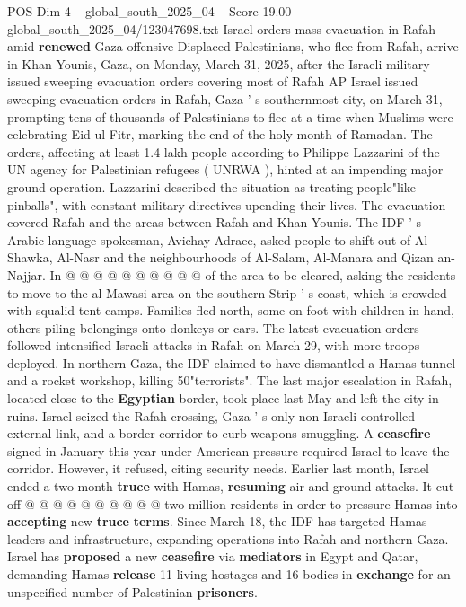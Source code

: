 \begin{textsample}{POS Dim 4 – global\_south\_2025\_04 – Score 19.00 – global\_south\_2025\_04/123047698.txt}  \label{ex:f4_pos_227}
Israel orders mass evacuation in Rafah amid \textbf{renewed} Gaza offensive Displaced Palestinians, who flee from Rafah, arrive in Khan Younis, Gaza, on Monday, March 31, 2025, after the Israeli military issued sweeping evacuation orders covering most of Rafah AP Israel issued sweeping evacuation orders in Rafah, Gaza ' s southernmost city, on March 31, prompting tens of thousands of Palestinians to flee at a time when Muslims were celebrating Eid ul-Fitr, marking the end of the holy month of Ramadan.
The orders, affecting at least 1.4 lakh people according to Philippe Lazzarini of the UN agency for Palestinian refugees ( UNRWA ), hinted at an impending major ground operation.
Lazzarini described the situation as treating people"like pinballs", with constant military directives upending their lives.
The evacuation covered Rafah and the areas between Rafah and Khan Younis.
The IDF ' s Arabic-language spokesman, Avichay Adraee, asked people to shift out of Al-Shawka, Al-Nasr and the neighbourhoods of Al-Salam, Al-Manara and Qizan an-Najjar.
In @ @ @ @ @ @ @ @ @ @ of the area to be cleared, asking the residents to move to the al-Mawasi area on the southern Strip ' s coast, which is crowded with squalid tent camps.
Families fled north, some on foot with children in hand, others piling belongings onto donkeys or cars.
The latest evacuation orders followed intensified Israeli attacks in Rafah on March 29, with more troops deployed.
In northern Gaza, the IDF claimed to have dismantled a Hamas tunnel and a rocket workshop, killing 50"terrorists".
The last major escalation in Rafah, located close to the \textbf{Egyptian} border, took place last May and left the city in ruins.
Israel seized the Rafah crossing, Gaza ' s only non-Israeli-controlled external link, and a border corridor to curb weapons smuggling.
A \textbf{ceasefire} signed in January this year under American pressure required Israel to leave the corridor.
However, it refused, citing security needs.
Earlier last month, Israel ended a two-month \textbf{truce} with Hamas, \textbf{resuming} air and ground attacks.
It cut off @ @ @ @ @ @ @ @ @ @ two million residents in order to pressure Hamas into \textbf{accepting} new \textbf{truce} \textbf{terms}.
Since March 18, the IDF has targeted Hamas leaders and infrastructure, expanding operations into Rafah and northern Gaza.
Israel has \textbf{proposed} a new \textbf{ceasefire} via \textbf{mediators} in Egypt and Qatar, demanding Hamas \textbf{release} 11 living hostages and 16 bodies in \textbf{exchange} for an unspecified number of Palestinian \textbf{prisoners}.

\end{textsample}
